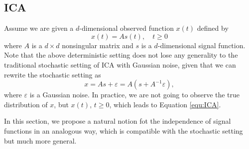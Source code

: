 \documentclass[twoside]{article}
\theoremstyle{definition}
\newcommand{\eps}{\varepsilon}
\begin{document}
\subsection{ICA}
\label{subsec:ICA}
Assume we are given a $d$-dimensional observed function $x(t)$ defined by  
\begin{equation}
\label{equ:ICA}
x(t) = As(t), \quad t\ge0
\end{equation}
where $A$ is a $d\times d$ nonsingular matrix and  $s$ is a $d$-dimensional signal function. 
Note that the above deterministic setting does not lose any generality to the traditional stochastic setting of ICA with Gaussian noise, given that we can rewrite the stochastic setting as 
\[
x = As+\eps = A(s+A^{-1}\eps),
\] 
where $\eps$ is a Gaussian noise. In practice, we are not going to observe the true distribution of $x$, but $x(t)$, $t\ge 0$, which leads to Equation \eqref{equ:ICA}.



In this section, we propose a natural notion fot the independence of signal functions in an analogous way, which is compatible with the stochastic setting but much more general.
\end{document}
